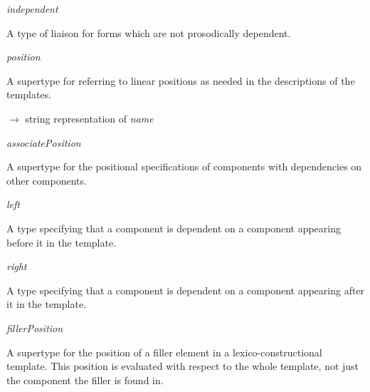 \begin{ontologytop}
\begin{classlist}
\begin{classlist}
		\end{classlist}

	\item \emph{independent}
	\hspace{1em}\parbox[t]{\linegoal}{\footnotesize A type of liaison for forms which are not prosodically dependent.}


	\end{classlist}

\newpage
\item \emph{position}
\hspace{1em}\parbox[t]{\linegoal}{\footnotesize A supertype for referring to linear positions as needed in the descriptions of the templates.}


	\begin{proplist}

	\item \textsc{\name} $\rightarrow$ string representation of \emph{name}

	\end{proplist}

	\begin{classlist}

	\item \emph{associatePosition}
	\hspace{1em}\parbox[t]{\linegoal}{\footnotesize A supertype for the positional specifications of components with dependencies on other components.}


		\begin{classlist}

		\item \emph{left}
		\hspace{1em}\parbox[t]{\linegoal}{\footnotesize A type specifying that a component is dependent on a component appearing before it in the template.}


		\item \emph{right}
		\hspace{1em}\parbox[t]{\linegoal}{\footnotesize A type specifying that a component is dependent on a component appearing after it in the template.}


		\end{classlist}

	\item \emph{fillerPosition}
	\hspace{1em}\parbox[t]{\linegoal}{\footnotesize A supertype for the position of a filler element in a lexico-constructional template. This position is evaluated with respect to the whole template, not just the component the filler is found in.}



\end{classlist}
\end{ontologytop}
